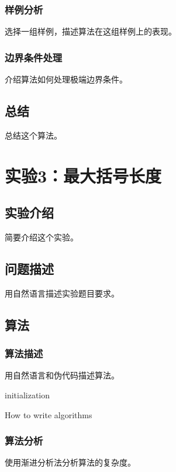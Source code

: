 \documentclass{ctexrep}
\begin{document}
\subsection{样例分析}
选择一组样例，描述算法在这组样例上的表现。
\subsection{边界条件处理}
介绍算法如何处理极端边界条件。

\section{总结}
总结这个算法。

\chapter{实验3：最大括号长度}
\section{实验介绍}
简要介绍这个实验。

\section{问题描述}
用自然语言描述实验题目要求。

\section{算法}
\subsection{算法描述}
用自然语言和伪代码描述算法。
\begin{algorithm}
\SetAlgoLined
{}
 initialization\;
 \caption{How to write algorithms}
\end{algorithm}

\subsection{算法分析}
使用渐进分析法分析算法的复杂度。
\end{document}
